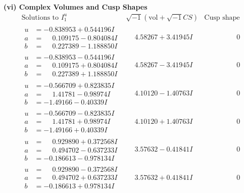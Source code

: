\documentclass[1p]{elsarticle_modified}
\theoremstyle{definition}
\newcommand{\I}{\sqrt{-1}}
\begin{document}
\newpage\flushleft \textbf{(vi) Complex Volumes and Cusp Shapes}
$$\begin{array}{c|c|c}  
\text{Solutions to }I^u_{1}& \I (\text{vol} + \sqrt{-1}CS) & \text{Cusp shape}\\
 \hline 
\begin{aligned}
u &= -0.838953 + 0.544196 I \\
a &= \phantom{-}0.109175 - 0.804084 I \\
b &= \phantom{-}0.227389 - 1.188850 I\end{aligned}
 & \phantom{-}4.58267 + 3.41945 I & \phantom{-0.000000 } 0 \\ \hline\begin{aligned}
u &= -0.838953 - 0.544196 I \\
a &= \phantom{-}0.109175 + 0.804084 I \\
b &= \phantom{-}0.227389 + 1.188850 I\end{aligned}
 & \phantom{-}4.58267 - 3.41945 I & \phantom{-0.000000 } 0 \\ \hline\begin{aligned}
u &= -0.566709 + 0.823835 I \\
a &= \phantom{-}1.41781 - 0.98974 I \\
b &= -1.49166 - 0.40339 I\end{aligned}
 & \phantom{-}4.10120 - 1.40763 I & \phantom{-0.000000 } 0 \\ \hline\begin{aligned}
u &= -0.566709 - 0.823835 I \\
a &= \phantom{-}1.41781 + 0.98974 I \\
b &= -1.49166 + 0.40339 I\end{aligned}
 & \phantom{-}4.10120 + 1.40763 I & \phantom{-0.000000 } 0 \\ \hline\begin{aligned}
u &= \phantom{-}0.929890 + 0.372568 I \\
a &= \phantom{-}0.494702 - 0.637233 I \\
b &= -0.186613 - 0.978134 I\end{aligned}
 & \phantom{-}3.57632 - 0.41841 I & \phantom{-0.000000 } 0 \\ \hline\begin{aligned}
u &= \phantom{-}0.929890 - 0.372568 I \\
a &= \phantom{-}0.494702 + 0.637233 I \\
b &= -0.186613 + 0.978134 I\end{aligned}
 & \phantom{-}3.57632 + 0.41841 I & \phantom{-0.000000 } 0 \\ \hline\begin{aligned}

\end{aligned}
\end{array}$$
\end{document}
